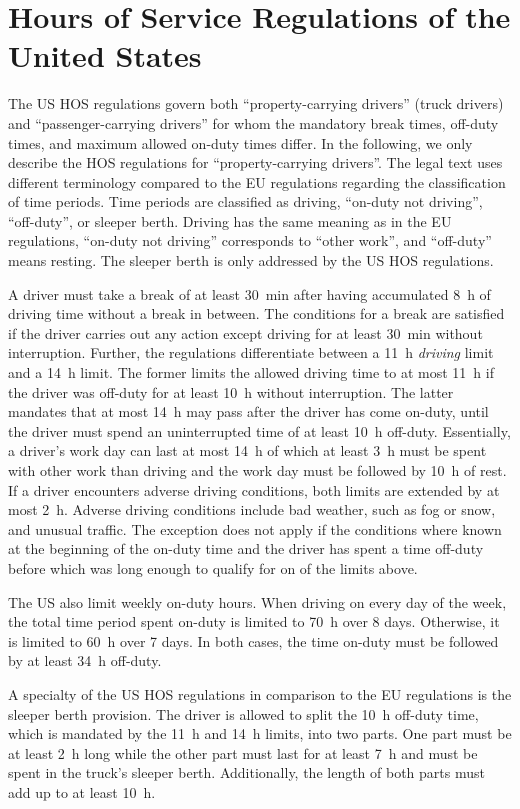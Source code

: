 \section{Hours of Service Regulations of the United States\label{sec:hos_us}}
The US HOS regulations \cite{federalmotorcarriersafetyadministrationfmcsa:2011} govern both ``property-carrying drivers'' (truck drivers) and ``passenger-carrying drivers'' for whom the mandatory break times, off-duty times, and maximum allowed on-duty times differ. In the following, we only describe the HOS regulations for ``property-carrying drivers''. The legal text uses different terminology compared to the EU regulations regarding the classification of time periods. Time periods are classified as driving, ``on-duty not driving'', ``off-duty'', or sleeper berth. Driving has the same meaning as in the EU regulations, ``on-duty not driving'' corresponds to ``other work'', and ``off-duty'' means resting. The sleeper berth is only addressed by the US HOS regulations.

A driver must take a break of at least \SI{30}{\minute} after having accumulated \SI{8}{\hour} of driving time without a break in between. The conditions for a break are satisfied if the driver carries out any action except driving for at least \SI{30}{\minute} without interruption. Further, the regulations differentiate between a \SI{11}{\hour} \emph{driving} limit and a \SI{14}{\hour} limit. The former limits the allowed driving time to at most \SI{11}{\hour} if the driver was off-duty for at least \SI{10}{\hour} without interruption. The latter mandates that at most \SI{14}{\hour} may pass after the driver has come on-duty, until the driver must spend an uninterrupted time of at least \SI{10}{\hour} off-duty. Essentially, a driver's work day can last at most \SI{14}{\hour} of which at least \SI{3}{\hour} must be spent with other work than driving and the work day must be followed by \SI{10}{\hour} of rest. If a driver encounters adverse driving conditions, both limits are extended by at most \SI{2}{\hour}. Adverse driving conditions include bad weather, such as fog or snow, and unusual traffic. The exception does not apply if the conditions where known at the beginning of the on-duty time and the driver has spent a time off-duty before which was long enough to qualify for on of the limits above.

The US also limit weekly on-duty hours. When driving on every day of the week, the total time period spent on-duty is limited to \SI{70}{\hour} over 8 days. Otherwise, it is limited to \SI{60}{\hour} over 7 days. In both cases, the time on-duty must be followed by at least \SI{34}{\hour} off-duty.

A specialty of the US HOS regulations in comparison to the EU regulations is the sleeper berth provision. The driver is allowed to split the \SI{10}{\hour} off-duty time, which is mandated by the \SI{11}{\hour} and \SI{14}{\hour} limits, into two parts. One part must be at least \SI{2}{\hour} long while the other part must last for at least \SI{7}{\hour} and must be spent in the truck's sleeper berth. Additionally, the length of both parts must add up to at least \SI{10}{\hour}.

